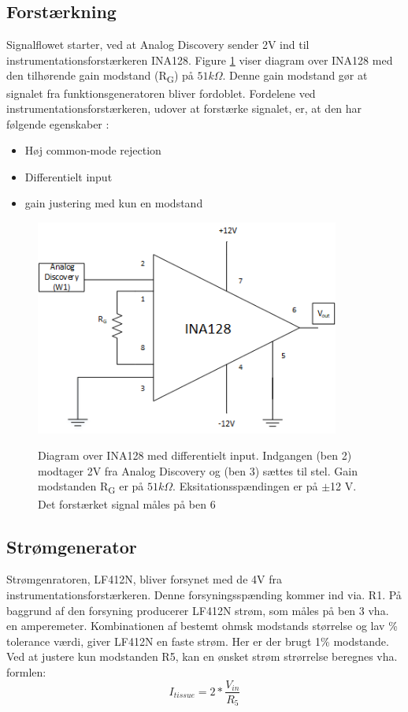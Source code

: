 \subsection{Forstærkning}
Signalflowet starter, ved at Analog Discovery sender 2V ind til instrumentationsforstærkeren INA128. Figure \ref{fig:ina128} viser diagram over INA128 med den tilhørende gain modstand (R\textsubscript{G}) på $ 51k\Omega $. Denne gain modstand gør at signalet fra funktionsgeneratoren bliver fordoblet\citep{TexasInstruments2005}. Fordelene ved instrumentationsforstærkeren, udover at forstærke signalet, er, at den har følgende egenskaber \cite{PeterJohansen2014}:
 
\begin{itemize}
\item Høj common-mode rejection
\item Differentielt input
\item gain justering med kun en modstand
\end{itemize}


\begin{figure}[H]
\centering
{\includegraphics[width=10cm]
{Figure/ina128}}
\caption{Diagram over INA128 med differentielt input. Indgangen (ben 2) modtager 2V fra Analog Discovery og (ben 3) sættes til stel. Gain modstanden R\textsubscript{G} er på $ 51k\Omega$. Eksitationsspændingen er på $\pm$12 V. Det forstærket signal måles på ben 6  }
\label{fig:ina128}
\end{figure}



\subsection{Strømgenerator}

Strømgenratoren, LF412N, bliver forsynet med de 4V fra instrumentationsforstærkeren. Denne forsyningsspænding kommer ind via. R1. På baggrund af den forsyning producerer LF412N strøm, som måles på ben 3 vha. en amperemeter. Kombinationen af bestemt ohmsk modstands størrelse og lav \% tolerance værdi, giver LF412N en faste strøm. Her er der brugt 1\% modstande. Ved at justere kun modstanden R5, kan en ønsket strøm strørrelse beregnes vha. formlen\cite{Aroom2009}: $$I_{tissue}=2*\frac{V_{in}}{R_{5}}$$


